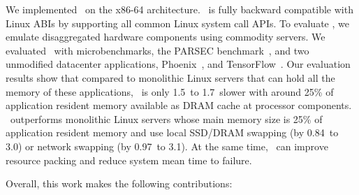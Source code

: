 \documentclass[10pt,times,twocolumn]{z2-article}
\begin{document}
We implemented \lego\ on the x86-64 architecture.
\lego\ is fully backward compatible with Linux ABIs
by supporting all common Linux system call APIs.
To evaluate \lego, we emulate disaggregated hardware components using commodity servers.
We evaluated \lego\ with microbenchmarks, the PARSEC benchmark~\cite{PARSEC}, %
and two unmodified datacenter applications, Phoenix~\cite{Ranger07-HPCA},
and TensorFlow~\cite{TensorFlow}.
Our evaluation results show that compared to monolithic Linux servers that can hold all the memory of these applications,
\lego\ is only 1.5\x\ to 1.7\x\ slower with around 25\% of application resident memory available as DRAM cache at processor components.
\lego\ outperforms monolithic Linux servers whose main memory size is 25\% of application resident memory 
and use local SSD/DRAM swapping (by 0.84\x\ to 3.0\x) or network swapping (by 0.97\x\ to 3.1\x). 
At the same time, \lego\ can improve resource packing %
and reduce system mean time to failure. %

Overall, this work makes the following contributions:
\end{document}
